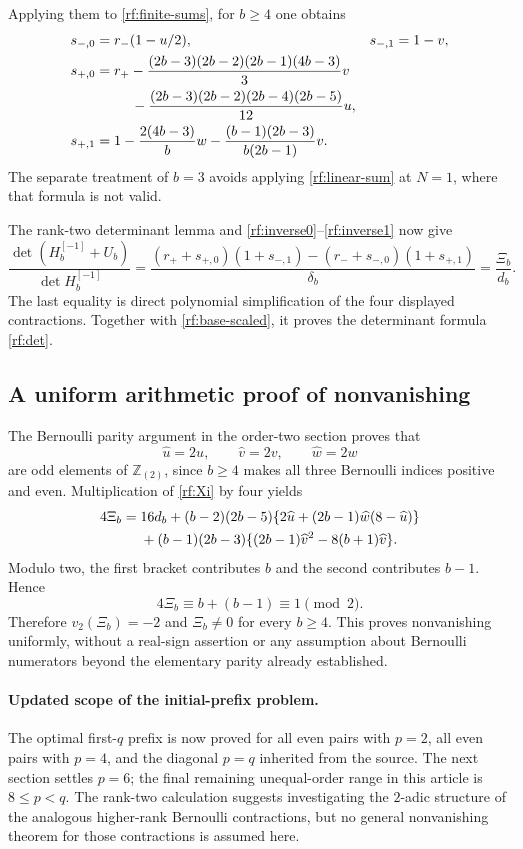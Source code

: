 \documentclass[11pt,a4paper]{article}
\numberwithin{equation}{section}
\theoremstyle{plain}
\theoremstyle{definition}
\theoremstyle{remark}
\begin{document}
Applying them to \eqref{rf:finite-sums}, for $b\geq4$ one obtains
\begin{align}
 s_{-,0}&=r_-(1-u/2),& s_{-,1}&=1-v,\notag\\
 s_{+,0}&=r_+
 -\frac{(2b-3)(2b-2)(2b-1)(4b-3)}3v\notag\\
 &\hspace{9mm}
 -\frac{(2b-3)(2b-2)(2b-4)(2b-5)}{12}u,\notag\\
 s_{+,1}&=1-\frac{2(4b-3)}b w
             -\frac{(b-1)(2b-3)}{b(2b-1)}v.
 \label{rf:four-contractions}
\end{align}
The separate treatment of $b=3$ avoids applying
\eqref{rf:linear-sum} at $N=1$, where that formula is not valid.

The rank-two determinant lemma and
\eqref{rf:inverse0}--\eqref{rf:inverse1} now give
\begin{equation}\label{rf:small-det}
 \frac{\det(H_b^{[-1]}+U_b)}{\det H_b^{[-1]}}
 =\frac{(r_++s_{+,0})(1+s_{-,1})
             -(r_-+s_{-,0})(1+s_{+,1})}{\delta_b}
 =\frac{\Xi_b}{d_b}.
\end{equation}
The last equality is direct polynomial simplification of the four
displayed contractions.  Together with \eqref{rf:base-scaled},
it proves the determinant formula \eqref{rf:det}.

\subsection{A uniform arithmetic proof of nonvanishing}

The Bernoulli parity argument in the order-two section proves that
\[
 \widehat u=2u,\qquad\widehat v=2v,\qquad\widehat w=2w
\]
are odd elements of $\mathbb Z_{(2)}$, since $b\geq4$ makes all
three Bernoulli indices positive and even.  Multiplication of
\eqref{rf:Xi} by four yields
\begin{align}
 4\Xi_b={}&16d_b
 +(b-2)(2b-5)
 \{2\widehat u+(2b-1)\widehat w(8-\widehat u)\}\notag\\
 &+(b-1)(2b-3)
 \{(2b-1)\widehat v^2-8(b+1)\widehat v\}.
 \label{rf:parity}
\end{align}
Modulo two, the first bracket contributes $b$ and the second
contributes $b-1$.  Hence
\[
 4\Xi_b\equiv b+(b-1)\equiv1\pmod2.
\]
Therefore $v_2(\Xi_b)=-2$ and $\Xi_b\ne0$ for every $b\geq4$.
This proves nonvanishing uniformly, without a real-sign assertion
or any assumption about Bernoulli numerators beyond the elementary
parity already established.

\paragraph{Updated scope of the initial-prefix problem.}
The optimal first-$q$ prefix is now proved for all even pairs with
$p=2$, all even pairs with $p=4$, and the diagonal $p=q$ inherited
from the source.  The next section settles $p=6$; the final remaining unequal-order
range in this article is $8\leq p<q$.  The rank-two calculation suggests investigating the
$2$-adic structure of the analogous higher-rank Bernoulli
contractions, but no general nonvanishing theorem for those
contractions is assumed here.
\end{document}
